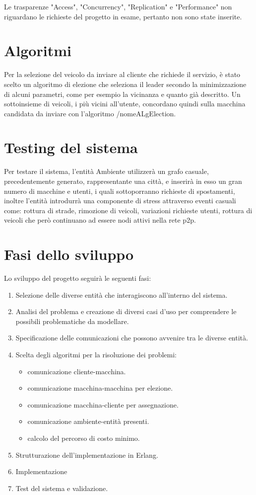 Le trasparenze "Access", "Concurrency", "Replication" e "Performance" non riguardano le richieste del progetto in esame, pertanto non sono state inserite.

\section{Algoritmi} \label{intro_algo}

Per la selezione del veicolo da inviare al cliente che richiede il servizio, è stato scelto un algoritmo di elezione che seleziona il leader secondo la minimizzazione di alcuni parametri, come per esempio la vicinanza e quanto già descritto. Un sottoinsieme di veicoli, i più vicini all'utente, concordano quindi sulla macchina candidata da inviare con l'algoritmo /nomeALgElection.

\section{Testing del sistema}

Per testare il sistema, l'entità Ambiente utilizzerà un grafo casuale, precedentemente generato, rappresentante una città, e inserirà in esso un gran numero di macchine e utenti, i quali sottoporranno richieste di spostamenti, inoltre l'entità introdurrà una componente di stress attraverso eventi casuali come: rottura di strade, rimozione di veicoli, variazioni richieste utenti, rottura di veicoli che però continuano ad essere nodi attivi nella rete p2p. 

\section{Fasi dello sviluppo}
Lo sviluppo del progetto seguirà le seguenti fasi:
\begin{enumerate}
	\item Selezione delle diverse entità che interagiscono all'interno del sistema.
	\item Analisi del problema e creazione di diversi casi d'uso per comprendere le possibili problematiche da modellare.
	\item Specificazione delle comunicazioni che possono avvenire tra le diverse entità.
	\item Scelta degli algoritmi per la risoluzione dei problemi: 
		\begin{itemize}
			\item comunicazione cliente-macchina.
			\item comunicazione macchina-macchina per elezione.
			\item comunicazione macchina-cliente per assegnazione.
			\item comunicazione ambiente-entità presenti.
			\item calcolo del percorso di costo minimo.
		\end{itemize}
	\item Strutturazione dell'implementazione in Erlang.
	\item Implementazione
	\item Test del sistema e validazione.
\end{enumerate}

